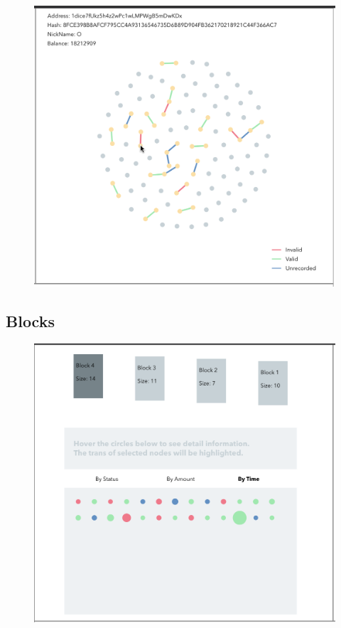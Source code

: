 \documentclass[journal, a4paper]{IEEEtran}
\begin{document}
\begin{figure}[!hbt]
		\begin{center}
		\includegraphics[width=\columnwidth]{transaction_hover.png}
		\caption{}
		\label{fig:transaction_hover}
		\end{center}
	\end{figure}

\subsection{Blocks}

\begin{figure}[!hbt]
		\begin{center}
		\includegraphics[width=\columnwidth]{blocks.png}
		\caption{}
		\label{fig:blocks}
		\end{center}
	\end{figure}
	
\end{document}
